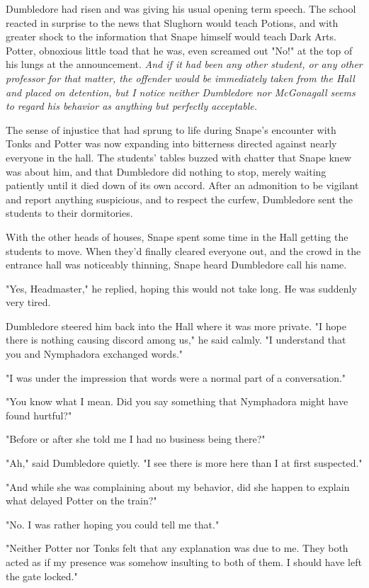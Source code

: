 \documentclass[a4paper,11pt]{article}
\begin{document}
Dumbledore had risen and was giving his usual opening term speech. The school reacted in surprise to the news that Slughorn would teach Potions, and with greater shock to the information that Snape himself would teach Dark Arts. Potter, obnoxious little toad that he was, even screamed out "No!" at the top of his lungs at the announcement. \emph{And if it had been any other student, or any other professor for that matter, the offender would be immediately taken from the Hall and placed on detention, but I notice neither Dumbledore nor McGonagall seems to regard his behavior as anything but perfectly acceptable.}

The sense of injustice that had sprung to life during Snape's encounter with Tonks and Potter was now expanding into bitterness directed against nearly everyone in the hall. The students' tables buzzed with chatter that Snape knew was about him, and that Dumbledore did nothing to stop, merely waiting patiently until it died down of its own accord. After an admonition to be vigilant and report anything suspicious, and to respect the curfew, Dumbledore sent the students to their dormitories.

With the other heads of houses, Snape spent some time in the Hall getting the students to move. When they'd finally cleared everyone out, and the crowd in the entrance hall was noticeably thinning, Snape heard Dumbledore call his name.

"Yes, Headmaster," he replied, hoping this would not take long. He was suddenly very tired.

Dumbledore steered him back into the Hall where it was more private. "I hope there is nothing causing discord among us," he said calmly. "I understand that you and Nymphadora exchanged words."

"I was under the impression that words were a normal part of a conversation."

"You know what I mean. Did you say something that Nymphadora might have found hurtful?"

"Before or after she told me I had no business being there?"

"Ah," said Dumbledore quietly. "I see there is more here than I at first suspected."

"And while she was complaining about my behavior, did she happen to explain what delayed Potter on the train?"

"No. I was rather hoping you could tell me that."

"Neither Potter nor Tonks felt that any explanation was due to me. They both acted as if my presence was somehow insulting to both of them. I should have left the gate locked."
\end{document}
